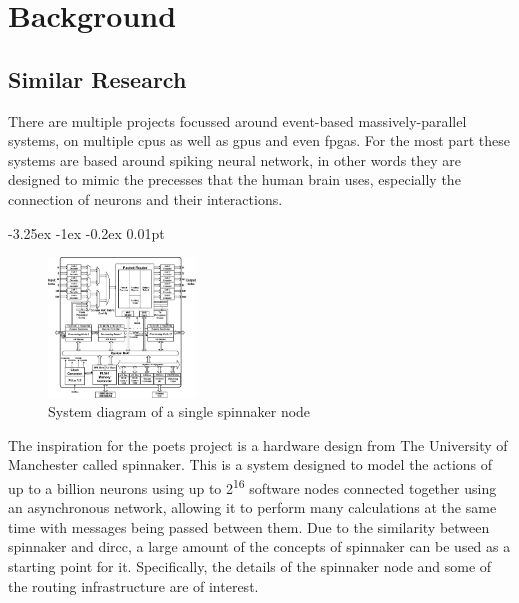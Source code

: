 \documentclass[paper=a4, fontsize=11pt, bibliography=totocnumbered]{scrartcl}
\makeatletter
\renewcommand\paragraph{\@startsection{paragraph}{4}{\z@}%
  {-3.25ex \@plus -1ex \@minus -0.2ex}%
  {0.01pt}%
  {\raggedsection\normalfont\sectfont\nobreak\size@paragraph}%
}
\numberwithin{equation}{section}		%
\numberwithin{figure}{section}			%
\numberwithin{table}{section}				%
\makeatother
\begin{document}
\section{Background}

\subsection{Similar Research} 
\label{subsec:similar}

There are multiple projects focussed around event-based massively-parallel systems, on multiple \glspl{cpu} as well as \glspl{gpu} and even \glspl{fpga}. For the most part these systems are based around spiking neural network, in other words they are designed to mimic the precesses that the human brain uses, especially the connection of neurons and their interactions.


\paragraph{} \label{subsec:spinnaker}

\begin{figure}
\centering
\vspace{-\normalbaselineskip}
\includegraphics[width=0.35\textwidth,keepaspectratio]{Organization-of-the-SpiNNaker-CMP.png}
\caption{System diagram of a single \gls{spinnaker} node\cite{pub:painkras2012spinnaker}}
\label{fig:spinnaker_node}
\vspace{-\normalbaselineskip}
\end{figure}

The inspiration for the \gls{poets} project is a hardware design from The University of Manchester called \gls{spinnaker}\cite{pub:painkras2012spinnaker}. This is a system designed to model the actions of up to a billion neurons using up to 2\textsuperscript{16} software nodes connected together using an asynchronous network, allowing it to perform many calculations at the same time with \glspl{message} being passed between them. Due to the similarity between \gls{spinnaker} and \gls{dircc}, a large amount of the concepts of \gls{spinnaker} can be used as a starting point for it. Specifically, the details of the \gls{spinnaker} node and some of the routing infrastructure are of interest.
\end{document}
